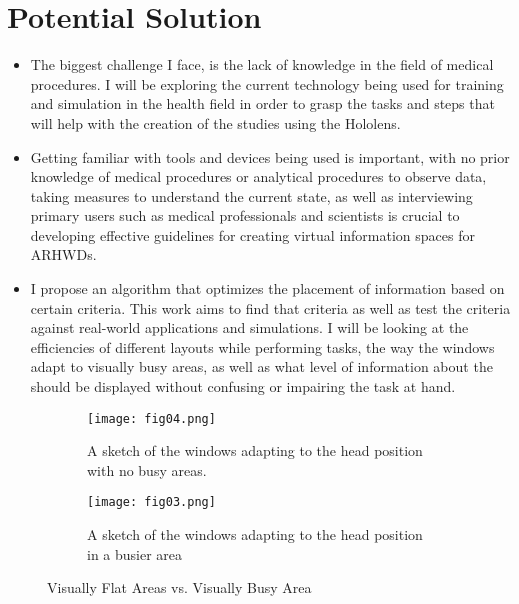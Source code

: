 \section{Potential Solution }
\label{sec:potentialsolution}
\begin{itemize}
	\item The biggest challenge I face, is the lack of knowledge in the field of medical procedures. I will be exploring the current technology being used for training and simulation in the health field in order to grasp the tasks and steps that will help with the creation of the studies using the Hololens. 
	\item Getting familiar with tools and devices being used is important, with no prior knowledge of medical procedures or analytical procedures to observe data, taking measures to understand the current state, as well as interviewing primary users such as medical professionals and scientists is crucial to developing effective guidelines for creating virtual information spaces for ARHWDs.
	\item I propose an algorithm that optimizes the placement of information based on certain criteria. This work aims to find that criteria as well as test the criteria against real-world applications and simulations. I will be looking at the efficiencies of different layouts while performing tasks, the way the windows adapt to visually busy areas, as well as what level of information about the should be displayed without confusing or impairing the task at hand.
\end{itemize}

\begin{figure}[h!]
  \centering
  \begin{subfigure}[b]{0.5\textwidth}
    \texttt{[image: fig04.png]}
    \caption{A sketch of the windows adapting to the head position with no busy areas.}
  \end{subfigure}
  \begin{subfigure}[b]{0.5\textwidth}
    \texttt{[image: fig03.png]}
    \caption{A sketch of the windows adapting to the head position in a busier area}
  \end{subfigure}
  \caption{Visually Flat Areas vs. Visually Busy Area}
  \label{fig:sketches}
\end{figure}
